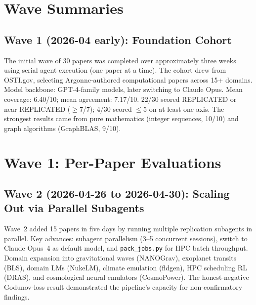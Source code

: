 \section{Wave Summaries}\label{sec:waves}

\subsection{Wave 1 (2026-04 early): Foundation Cohort}
The initial wave of 30 papers was completed over approximately three weeks
using serial agent execution (one paper at a time). The cohort drew from
OSTI.gov, selecting Argonne-authored computational papers across 15+ domains.
Model backbone: GPT-4-family models, later switching to Claude Opus.
Mean coverage: 6.40/10; mean agreement: 7.17/10.
22/30 scored REPLICATED or near-REPLICATED ($\geq$7/7); 4/30 scored $\leq$5
on at least one axis. The strongest results came from pure mathematics
(integer sequences, 10/10) and graph algorithms (GraphBLAS, 9/10).

\iffull
\clearpage
\section*{Wave 1: Per-Paper Evaluations}






























\fi

\subsection{Wave 2 (2026-04-26 to 2026-04-30): Scaling Out via Parallel Subagents}
Wave~2 added 15 papers in five days by running multiple replication subagents
in parallel. Key advances: subagent parallelism (3--5 concurrent sessions),
switch to Claude Opus~4 as default model, and \texttt{pack\_jobs.py} for HPC
batch throughput. Domain expansion into gravitational waves (NANOGrav),
exoplanet transits (BLS), domain LMs (NukeLM), climate emulation (fldgen),
HPC scheduling RL (DRAS), and cosmological neural emulators (CosmoPower).
The honest-negative Godunov-loss result demonstrated the pipeline's capacity
for non-confirmatory findings.

